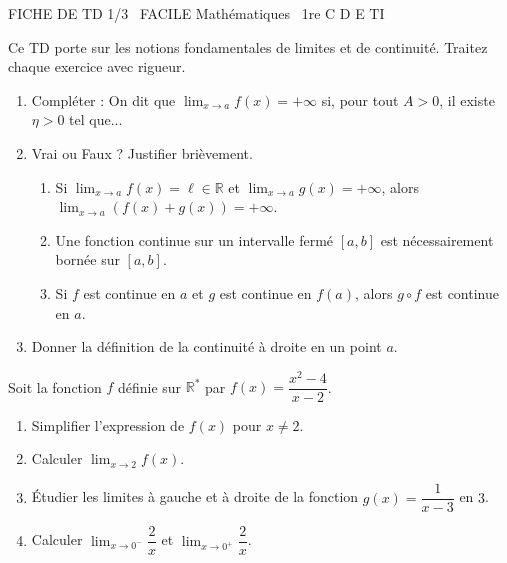 \documentclass[11pt]{article}
\begin{document}
\begin{tcolorbox}[enhanced,colback=popink,colframe=popink,arc=10pt,boxrule=0pt,left=12pt,right=12pt,top=9pt,bottom=9pt]
{\color{white}\popxbold\small FICHE DE TD 1/3 \textbullet\ FACILE \hfill Mathématiques \textbullet\ 1re C D E TI\par}
\end{tcolorbox}
\vspace{4pt}
Ce TD porte sur les notions fondamentales de limites et de continuité. Traitez chaque exercice avec rigueur.

\begin{exercice}
\begin{enumerate}
    \item Compléter : On dit que $\lim_{x \to a} f(x) = +\infty$ si, pour tout $A > 0$, il existe $\eta > 0$ tel que...
    \item Vrai ou Faux ? Justifier brièvement.
    \begin{enumerate}
        \item Si $\lim_{x \to a} f(x) = \ell \in \mathbb{R}$ et $\lim_{x \to a} g(x) = +\infty$, alors $\lim_{x \to a} (f(x)+g(x)) = +\infty$.
        \item Une fonction continue sur un intervalle fermé $[a,b]$ est nécessairement bornée sur $[a,b]$.
        \item Si $f$ est continue en $a$ et $g$ est continue en $f(a)$, alors $g \circ f$ est continue en $a$.
    \end{enumerate}
    \item Donner la définition de la continuité à droite en un point $a$.
\end{enumerate}
\end{exercice}

\begin{exercice}
Soit la fonction $f$ définie sur $\mathbb{R}^*$ par $f(x) = \dfrac{x^2 - 4}{x - 2}$.
\begin{enumerate}
    \item Simplifier l'expression de $f(x)$ pour $x \neq 2$.
    \item Calculer $\lim_{x \to 2} f(x)$.
    \item Étudier les limites à gauche et à droite de la fonction $g(x) = \dfrac{1}{x-3}$ en $3$.
    \item Calculer $\lim_{x \to 0^-} \dfrac{2}{x}$ et $\lim_{x \to 0^+} \dfrac{2}{x}$.
\end{enumerate}
\end{exercice}
\end{document}
